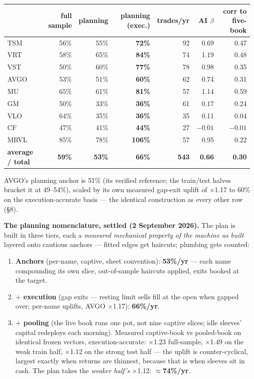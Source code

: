 \documentclass[11pt,a4paper]{article}
\newcommand{\tabnote}[1]{\begin{center}\begin{minipage}{0.92\textwidth}
  \footnotesize\color{bcgrey}#1\end{minipage}\end{center}}
\begin{document}
\begin{center}
\begin{tabular}{lrrrrrr}
\toprule
 & full sample & planning & \textbf{planning (exec.)} & trades/yr & AI $\beta$ & corr to five-book \\
\midrule
TSM  &  56\% &  55\% & \textbf{72\%} &  92 & 0.69 & 0.47 \\
VRT  &  58\% &  65\% & \textbf{84\%} &  74 & 1.19 & 0.48 \\
VST  &  50\% &  60\% & \textbf{77\%} &  78 & 0.98 & 0.35 \\
AVGO &  53\% &  51\% & \textbf{60\%} &  62 & 0.74 & 0.31 \\
MU   &  65\% &  61\% & \textbf{81\%} &  57 & 1.14 & 0.59 \\
GM   &  50\% &  33\% & \textbf{36\%} &  61 & 0.17 & 0.24 \\
VLO  &  64\% &  35\% & \textbf{36\%} &  35 & 0.11 & 0.04 \\
CF   &  47\% &  41\% & \textbf{44\%} &  27 & $-0.01$ & $-0.01$ \\
MRVL &  85\% &  78\% & \textbf{106\%} &  57 & 0.95 & 0.22 \\
\midrule
\textbf{average / total} & \textbf{59\%} & \textbf{53\%} & \textbf{66\%} & \textbf{543} & \textbf{0.66} & \textbf{0.30} \\
\bottomrule
\end{tabular}
\end{center}

\tabnote{AVGO's planning anchor is 51\% (its verified reference; the train/test
halves bracket it at 49--54\%), scaled by its own measured gap-exit uplift of
$\times$1.17 to 60\% on the execution-accurate basis --- the identical
construction as every other row (\S8).}

\textbf{The planning nomenclature, settled (2 September 2026).} The plan is
built in three tiers, each a \emph{measured mechanical property of the machine
as built} layered onto cautious anchors --- fitted edges get haircuts; plumbing
gets counted:

\begin{enumerate}
\item \textbf{Anchors} (per-name, captive, sheet convention): \textbf{53\%/yr}
      --- each name compounding its own slice, out-of-sample haircuts applied,
      exits booked at the target.
\item \textbf{$+$ execution} (gap exits --- resting limit sells fill at the
      open when gapped over; per-name uplifts, AVGO $\times$1.17):
      \textbf{66\%/yr}.
\item \textbf{$+$ pooling} (the live book runs one pot, not nine captive
      slices; idle sleeves' capital redeploys each morning). Measured
      captive-book vs pooled-book on identical frozen vectors,
      execution-accurate: $\times$1.23 full-sample, $\times$1.49 on the weak
      train half, $\times$1.12 on the strong test half --- the uplift is
      counter-cyclical, largest exactly when returns are thinnest, because
      that is when sleeves sit in cash. The plan takes the \emph{weaker
      half's} $\times$1.12: \textbf{$\approx$74\%/yr}.
\end{enumerate}
\end{document}
